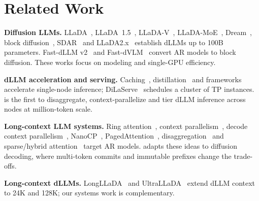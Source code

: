 \section{Related Work}
\label{sec:related}

\textbf{Diffusion LLMs.} LLaDA~\cite{nie2025llada}, LLaDA~1.5~\cite{zhu2025llada15},
LLaDA-V~\cite{you2025lladav}, LLaDA-MoE~\cite{zhu2025lladamoe}, Dream~\cite{ye2025dream}, block
diffusion~\cite{arriola2025blockdiffusion}, SDAR~\cite{cheng2025sdar} and
LLaDA2.x~\cite{bie2025llada2,bie2026llada21,llada22} establish dLLMs up to 100B parameters.
Fast-dLLM v2~\cite{wu2025fastdllmv2} and Fast-dVLM~\cite{wu2026fastdvlm} convert AR models to block
diffusion. These works focus on modeling and single-GPU efficiency.

\textbf{dLLM acceleration and serving.} Caching~\cite{wu2025fastdllm,ma2025dkvcache,
liu2025dllmcache,jiang2025d2cache,song2025sparsedllm}, distillation~\cite{wang2025d2f} and
frameworks~\cite{ma2025dinfer,sglangdllm,diffusiongemma} accelerate single-node inference;
DiLaServe~\cite{chang2026dilaserve} schedules a cluster of TP instances. \sys is the first to
disaggregate, context-parallelize and tier dLLM inference across nodes at million-token scale.

\textbf{Long-context LLM systems.} Ring attention~\cite{liu2023ringattention}, context
parallelism~\cite{yang2024contextparallel}, decode context parallelism~\cite{vllmdcp},
NanoCP~\cite{chen2026nanocp}, PagedAttention~\cite{kwon2023vllm}, disaggregation~\cite{zhong2024distserve,
qin2024mooncake,vllmmoriio} and sparse/hybrid attention~\cite{yang2025qwen25_1m,deepseek2025v32}
target AR models. \sys adapts these ideas to diffusion decoding, where multi-token commits and
immutable prefixes change the trade-offs.

\textbf{Long-context dLLMs.} LongLLaDA~\cite{liu2025longllada} and UltraLLaDA~\cite{he2025ultrallada}
extend dLLM context to 24K and 128K; our systems work is complementary.

